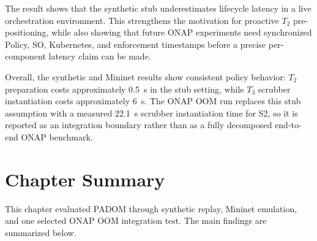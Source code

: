 \documentclass[12pt, a4paper, reqno, oneside]{book}
\newcommand{\padonap}{\textsc{PADOM}}
\newcommand{\tier}[1]{$T_{#1}$}
\begin{document}
The result shows that the synthetic stub underestimates lifecycle latency in a live orchestration environment. This strengthens the motivation for proactive
\tier{2} pre-positioning, while also showing that future ONAP experiments need synchronized Policy, SO, Kubernetes, and enforcement timestamps before a precise per-component latency claim can be made.

Overall, the synthetic and Mininet results show consistent policy behavior: \tier{2} preparation costs approximately 0.5~s in the stub setting, while \tier{3} scrubber instantiation costs approximately 6~s. The ONAP OOM run replaces this stub assumption with a measured 22.1~s scrubber instantiation time for S2, so it is reported as an integration boundary rather than as a fully decomposed end-to-end ONAP benchmark.
\section{Chapter Summary}
\label{sec:eval-summary}

This chapter evaluated \padonap{} through synthetic replay, Mininet emulation, and one selected ONAP OOM integration test. The main findings are summarized below.
\end{document}
